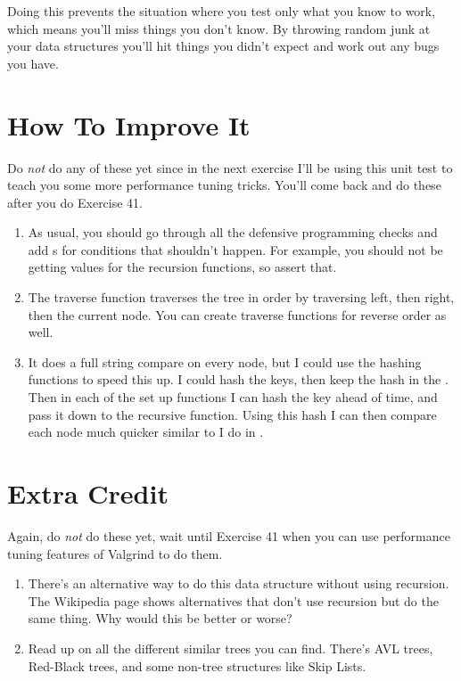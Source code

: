 Doing this prevents the situation where you test only what you know to work,
which means you'll miss things you don't know.  By throwing random junk at
your data structures you'll hit things you didn't expect and work out any
bugs you have.


\section{How To Improve It}

Do \emph{not} do any of these yet since in the next exercise I'll be using this
unit test to teach you some more performance tuning tricks.  You'll come back and do
these after you do Exercise 41.

\begin{enumerate}
\item As usual, you should go through all the defensive programming checks and add
    s for conditions that shouldn't happen.  For example, you should
    not be getting  values for the recursion functions, so assert that.
\item The traverse function traverses the tree in order by traversing left, then right,
    then the current node.  You can create traverse functions for reverse order as well.
\item It does a full string compare on every node, but I could use the 
    hashing functions to speed this up.  I could hash the keys, then keep the hash in
    the .  Then in each of the set up functions I can hash the 
    key ahead of time, and pass it down to the recursive function.  Using this hash I can
    then compare each node much quicker similar to I do in .
\end{enumerate}

\section{Extra Credit}

Again, do \emph{not} do these yet, wait until Exercise 41 when you can use performance
tuning features of Valgrind to do them.

\begin{enumerate}
\item There's an alternative way to do this data structure without using recursion.  The Wikipedia
    page shows alternatives that don't use recursion but do the same thing.  Why would this 
    be better or worse?
\item Read up on all the different similar trees you can find. There's AVL trees, Red-Black trees,
    and some non-tree structures like Skip Lists.
\end{enumerate}


